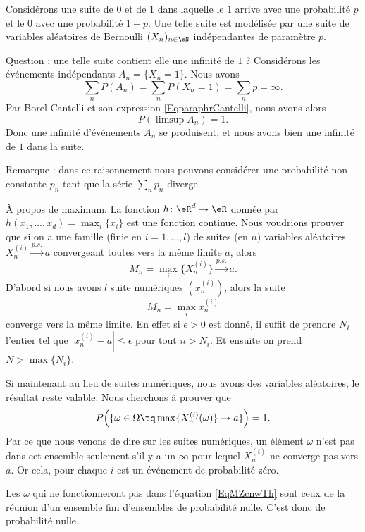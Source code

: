 \begin{example}
    Considérons une suite de \( 0\) et de \( 1\) dans laquelle le \( 1\) arrive avec une probabilité \( p\) et le \( 0\) avec une probabilité \( 1-p\). Une telle suite est modélisée par une suite de variables aléatoires de Bernoulli \( (X_n)_{n\in\eN}\) indépendantes de paramètre \( p\).

    Question : une telle suite contient elle une infinité de \( 1\) ? Considérons les événements indépendants \( A_n=\{ X_n=1 \}\). Nous avons
    \begin{equation}
        \sum_n P(A_n)=\sum_nP(X_n=1)=\sum_np=\infty.
    \end{equation}
    Par Borel-Cantelli et son expression \eqref{EqparaphrCantelli}, nous avons alors
    \begin{equation}
        P(\limsup A_n)=1.
    \end{equation}
    Donc une infinité d'événements \( A_n\) se produisent, et nous avons bien une infinité de \( 1\) dans la suite.

    Remarque : dans ce raisonnement nous pouvons considérer une probabilité non constante \( p_n\) tant que la série \( \sum_np_n\) diverge.
\end{example}

\begin{example}
    À propos de maximum. La fonction \( h\colon \eR^d\to \eR\) donnée par \( h(x_1,\ldots, x_d)=\max_i\{ x_i \}\) est une fonction continue. Nous voudrions prouver que si on a une famille (finie en \( i=1,\ldots, l\)) de suites (en \( n\)) variables aléatoires \( X^{(i)}_n\stackrel{p.s.}{\longrightarrow} a\) convergeant toutes vers la même limite \( a\), alors
    \begin{equation}
        M_n=\max_i\{ X^{(i)}_n \}\stackrel{p.s.}{\longrightarrow} a.
    \end{equation}
    D'abord si nous avons \( l\) suite numériques \( (x^{(i)}_n)\), alors la suite
    \begin{equation}
        M_n=\max_ix_n^{(i)}
    \end{equation}
    converge vers la même limite. En effet si \( \epsilon>0\) est donné, il suffit de prendre \( N_i\) l'entier tel que \( | x^{(i)}_n-a |\leq \epsilon\) pour tout \( n>N_i\). Et ensuite on prend \( N>\max\{ N_i \}\).

    Si maintenant au lieu de suites numériques, nous avons des variables aléatoires, le résultat reste valable. Nous cherchons à prouver que
    \begin{equation}\label{EqMZcnwTh}
        P\Big( \{ \omega\in \Omega\tq \max\{ X^{(i)}_n(\omega) \}\to a \} \Big)=1.
    \end{equation}
    Par ce que nous venons de dire sur les suites numériques, un élément \( \omega\) n'est
    pas dans cet ensemble seulement s'il y a un \( \infty\) pour lequel \( X^{(i)}_n\) ne converge pas vers \( a\). Or cela, pour chaque \( i\) est un événement de probabilité zéro.

    Les \( \omega\) qui ne fonctionneront pas dans l'équation \eqref{EqMZcnwTh} sont ceux de la réunion d'un ensemble fini d'ensembles de probabilité nulle. C'est donc de probabilité nulle.
\end{example}

